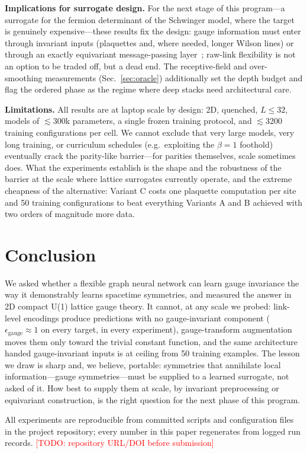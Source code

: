 \documentclass[aps,prd,twocolumn,superscriptaddress,nofootinbib]{revtex4-2}
\newcommand{\epsg}{\ensuremath{\epsilon_{\text{gauge}}}}
\newcommand{\todo}[1]{\textcolor{red}{[TODO: #1]}}
\begin{document}
\textbf{Implications for surrogate design.} For the next stage of this
program---a surrogate for the fermion determinant of the Schwinger
model, where the target is genuinely expensive---these results fix the
design: gauge information must enter through invariant inputs
(plaquettes and, where needed, longer Wilson lines) or through an
exactly equivariant message-passing layer~\cite{Rayat2026}; raw-link
flexibility is not an option to be traded off, but a dead end. The
receptive-field and over-smoothing measurements
(Sec.~\ref{sec:oracle}) additionally set the depth budget and flag the
ordered phase as the regime where deep stacks need architectural care.

\textbf{Limitations.} All results are at laptop scale by design:
2D, quenched, $L \le 32$, models of $\lesssim 300$k parameters, a single
frozen training protocol, and $\lesssim 3200$ training configurations
per cell. We cannot exclude that very large models, very long training,
or curriculum schedules (e.g.\ exploiting the $\beta=1$ foothold)
eventually crack the parity-like barrier---for parities themselves,
scale sometimes does. What the experiments establish is the shape and
the robustness of the barrier at the scale where lattice surrogates
currently operate, and the extreme cheapness of the alternative:
Variant C costs one plaquette computation per site and 50 training
configurations to beat everything Variants A and B achieved with two
orders of magnitude more data.

\section{Conclusion}
\label{sec:conclusion}

We asked whether a flexible graph neural network can learn gauge
invariance the way it demonstrably learns spacetime symmetries, and
measured the answer in 2D compact U(1) lattice gauge theory. It cannot,
at any scale we probed: link-level encodings produce predictions with no
gauge-invariant component ($\epsg \approx 1$ on every target, in every
experiment), gauge-transform augmentation moves them only toward the
trivial constant function, and the same architecture handed
gauge-invariant inputs is at ceiling from 50 training examples. The
lesson we draw is sharp and, we believe, portable: symmetries that
annihilate local information---gauge symmetries---must be supplied to a
learned surrogate, not asked of it. How best to supply them at scale,
by invariant preprocessing or equivariant construction, is the right
question for the next phase of this program.

\begin{acknowledgments}
All experiments are reproducible from committed scripts and
configuration files in the project repository; every number in this
paper regenerates from logged run records.
\todo{repository URL/DOI before submission}
\end{acknowledgments}


\end{document}
